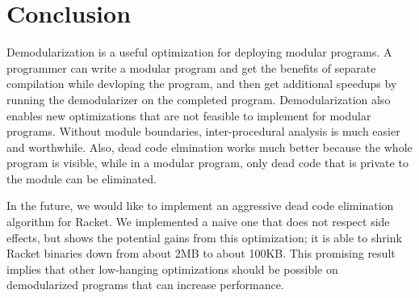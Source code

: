 \chapter{Conclusion}
\label{chap:conclusion}

Demodularization is a useful optimization for deploying modular programs. 
A programmer can write a modular program and get the benefits of separate compilation while devloping the program, and then get additional speedups by running the demodularizer on the completed program.
Demodularization also enables new optimizations that are not feasible to implement for modular programs.
Without module boundaries, inter-procedural analysis is much easier and worthwhile.
Also, dead code elmination works much better because the whole program is visible, while in a modular program, only dead code that is private to the module can be eliminated.

In the future, we would like to implement an aggressive dead code elimination algorithm for Racket.
We implemented a naive one that does not respect side effects, but shows the potential gains from this optimization; it is able to shrink Racket binaries down from about 2MB to about 100KB\@.
This promising result implies that other low-hanging optimizations should be possible on demodularized programs that can increase performance.

